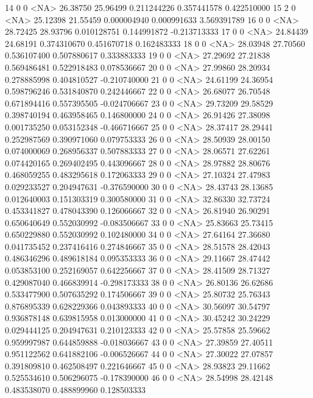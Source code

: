 \documentclass{beamer}
\begin{document}
\begin{frame}[fragile]
\begin{itemize}
\begin{Schunk}
\begin{Soutput}
14       0       0 <NA> 26.38750 25.96499 0.211244226 0.357441578  0.422510000
15       2       0 <NA> 25.12398 21.55459 0.000004940 0.000991633  3.569391789
16       0       0 <NA> 28.72425 28.93796 0.010128751 0.144991872 -0.213713333
17       0       0 <NA> 24.84439 24.68191 0.374310670 0.451670718  0.162483333
18       0       0 <NA> 28.03948 27.70560 0.536107400 0.507880617  0.333883333
19       0       0 <NA> 27.29692 27.21838 0.569486481 0.522918483  0.078536667
20       0       0 <NA> 27.99860 28.20934 0.278885998 0.404810527 -0.210740000
21       0       0 <NA> 24.61199 24.36954 0.598796246 0.531840870  0.242446667
22       0       0 <NA> 26.68077 26.70548 0.671894416 0.557395505 -0.024706667
23       0       0 <NA> 29.73209 29.58529 0.398740194 0.463958465  0.146800000
24       0       0 <NA> 26.91426 27.38098 0.001735250 0.053152348 -0.466716667
25       0       0 <NA> 28.37417 28.29441 0.252987569 0.390971060  0.079753333
26       0       0 <NA> 28.50939 28.00150 0.074000069 0.268956337  0.507883333
27       0       0 <NA> 28.06571 27.62261 0.074420165 0.269402495  0.443096667
28       0       0 <NA> 28.97882 28.80676 0.468059255 0.483295618  0.172063333
29       0       0 <NA> 27.10324 27.47983 0.029233527 0.204947631 -0.376590000
30       0       0 <NA> 28.43743 28.13685 0.012640003 0.151303319  0.300580000
31       0       0 <NA> 32.86330 32.73724 0.453341827 0.478043390  0.126066667
32       0       0 <NA> 26.81940 26.90291 0.650640649 0.552030992 -0.083506667
33       0       0 <NA> 25.83663 25.73415 0.650229880 0.552030992  0.102480000
34       0       0 <NA> 27.64164 27.36680 0.041735452 0.237416416  0.274846667
35       0       0 <NA> 28.51578 28.42043 0.486346296 0.489618184  0.095353333
36       0       0 <NA> 29.11667 28.47442 0.053853100 0.252169057  0.642256667
37       0       0 <NA> 28.41509 28.71327 0.429087040 0.466839914 -0.298173333
38       0       0 <NA> 26.80136 26.62686 0.533477900 0.507635292  0.174506667
39       0       0 <NA> 25.80732 25.76343 0.876895339 0.628229366  0.043893333
40       0       0 <NA> 30.56097 30.54797 0.936878148 0.639815958  0.013000000
41       0       0 <NA> 30.45242 30.24229 0.029444125 0.204947631  0.210123333
42       0       0 <NA> 25.57858 25.59662 0.959997987 0.644859888 -0.018036667
43       0       0 <NA> 27.39859 27.40511 0.951122562 0.641882106 -0.006526667
44       0       0 <NA> 27.30022 27.07857 0.391809810 0.462508497  0.221646667
45       0       0 <NA> 28.93823 29.11662 0.525534610 0.506296075 -0.178390000
46       0       0 <NA> 28.54998 28.42148 0.483538070 0.488899960  0.128503333

\end{Soutput}
\end{Schunk}
\end{itemize}
\end{frame}
\end{document}
